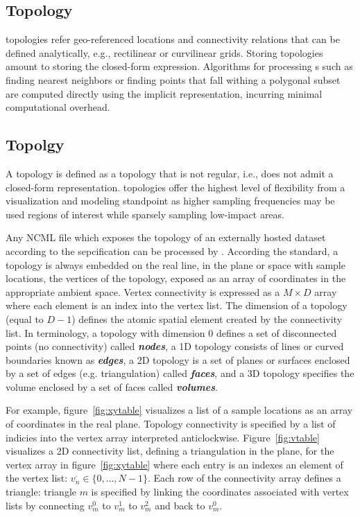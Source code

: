 \subsection{\cgrid{} Topology}
\cgrid{} topologies refer geo-referenced locations and connectivity
relations that can be defined analytically, e.g., rectilinear or
curvilinear grids. Storing \cgrid{} topologies amount to storing the
closed-form expression. Algorithms for processing \cgrid{}s such as
finding nearest neighbors or finding points that fall withing a
polygonal subset are computed directly using the implicit \cgrid{}
representation, incurring minimal computational overhead.

\subsection{\ugrid{} Topolgy}
A \ugrid{} topology is  defined as a topology that is not regular, i.e.,
does not admit a closed-form representation. \ugrid{} topologies offer
the highest level of flexibility from a visualization and modeling
standpoint as higher sampling frequencies may be used regions of
interest while sparsely sampling low-impact areas.

Any NCML file which exposes the topology of an externally hosted
dataset according to the \cfugrid{} sepcification can be processed by
\sciwms{}. According the \cfugrid{} standard, a topology is always
embedded on the real line, in the plane or space with sample
locations, the vertices of the topology, exposed as an array of
coordinates in the appropriate ambient space. Vertex connectivity is
expressed as a $M \times D$ array where each element is an index into
the vertex list. The dimension of a topology (equal to $D - 1$) defines the
atomic spatial element created by the connectivity list. In \cfugrid{}
terminology, a topology with dimension 0 defines a set of disconnected
points (no connectivity) called \textbf{\textit{nodes}}, a 1D topology
consists of lines or curved boundaries known as
\textbf{\textit{edges}}, a 2D topology is a set of planes or surfaces
enclosed by a set of edges (e.g. triangulation) called
\textbf{\textit{faces}}, and a 3D topology specifies the volume enclosed
by a set of faces called \textbf{\textit{volumes}}.

For example, figure~\ref{fig:xytable} visualizes a list of a sample
locations as an array of coordinates in the real plane. Topology
connectivity is specified by a list of indicies into the vertex array
interpreted anticlockwise. Figure~\ref{fig:vtable} visualizes a 2D
connectivity list, defining a triangulation in the plane, for the
vertex array in figure~\ref{fig:xytable} where each entry is an
indexes an element of the vertex list: $v_n^{\cdot}\in
\{0,\ldots,N-1\}$. Each row of the connectivity array defines a
triangle: triangle $m$ is specified by linking the coordinates
associated with vertex lists by connecting $v^0_m$ to $v^1_m$ to
$v^2_m$ and back to $v^0_m$.

